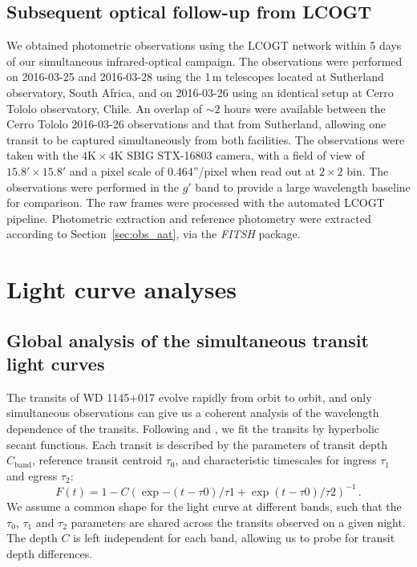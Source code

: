\documentclass[iop,useAMES,usenatbig]{emulateapj}
\begin{document}
\subsection{Subsequent optical follow-up from LCOGT}
\label{sec:lcogt}

We obtained photometric observations using the LCOGT network within 5 days of our simultaneous infrared-optical campaign. The observations were performed on 2016-03-25 and 2016-03-28 using the 1\,m telescopes located at Sutherland observatory, South Africa, and on 2016-03-26 using an identical setup at Cerro Tololo observatory, Chile. An overlap of $\sim 2$ hours were available between the Cerro Tololo 2016-03-26 observations and that from Sutherland, allowing one transit to be captured simultaneously from both facilities. The observations were taken with the $4\mathrm{K} \times 4 \mathrm{K}$ SBIG STX-16803 camera, with a field of view of $15.8'\times 15.8'$ and a pixel scale of 0.464''/pixel when read out at $2\times 2$ bin. The observations were performed in the $g'$ band to provide a large wavelength baseline for comparison. The raw frames were processed with the automated LCOGT pipeline. Photometric extraction and reference photometry were extracted according to Section~\ref{sec:obs_aat}, via the \emph{FITSH} package. 

\section{Light curve analyses}
\label{sec:lightcurve_model}

\subsection{Global analysis of the simultaneous transit light curves}
\label{sec:simultaneous_lc}

The transits of WD 1145+017 evolve rapidly from orbit to orbit, and only simultaneous observations can give us a coherent analysis of the wavelength dependence of the transits. Following \citet{2012ApJ...752....1R} and \citet{2015arXiv151006434C}, we fit the transits by hyperbolic secant functions. Each transit is described by the parameters of transit depth $C_\mathrm{band}$, reference transit centroid $\tau_0$, and characteristic timescales for ingress $\tau_1$ and egress $\tau_2$:
\begin{equation}
\label{eq:model}
  F(t) = 1 - C \left( \exp{-(t-\tau0)/\tau1} + \exp{(t-\tau0)/\tau2} \right)^{-1}\,.
\end{equation}
We assume a common shape for the light curve at different bands, such that the $\tau_0$, $\tau_1$ and $\tau_2$ parameters are shared across the transits observed on a given night. The depth $C$ is left independent for each band, allowing us to probe for transit depth differences.
\end{document}
